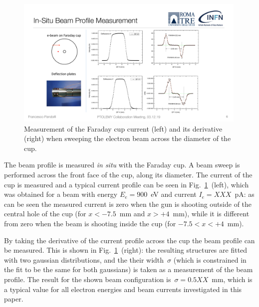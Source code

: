 \documentclass[12p]{paper}
\begin{document}
\begin{figure}[tb]
  \centering
\includegraphics[width=0.99\textwidth]{figures/FC_scan.pdf}
 \caption{Measurement of the Faraday cup current (left) and its derivative (right) when sweeping the electron beam across the diameter of the cup.
  \label{fig:FC_scan}}
\end{figure}


The beam profile is measured {\em in situ} with the Faraday cup. A beam sweep is performed across the front face of the cup, along its diameter. The current of the cup is measured and a typical current profile can be seen in Fig.~\ref{fig:FC_scan}~(left), which was obtained for a beam with energy $E_e = 900$~eV and current $I_e = XXX$~pA: as can be seen the measured current is zero when the gun is shooting outside of the central hole of the cup (for $x < -7.5$~mm and $x > +4$~mm), while it is different from zero when the beam is shooting inside the cup (for $-7.5 < x < +4$~mm). 

By taking the derivative of the current profile across the cup the beam profile can be measured. This is shown in Fig.~\ref{fig:FC_scan}~(right): the resulting structures are fitted with two gaussian distributions, and the their width~$\sigma$ (which is constrained in the fit to be the same for both gaussians) is taken as a measurement of the beam profile. The result for the shown beam configuration is~$\sigma = 0.5XX$~mm, which is a typical value for all electron energies and beam currents investigated in this paper.  
\end{document}
